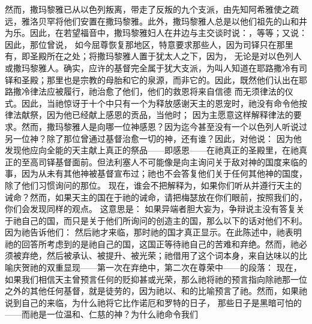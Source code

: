 然而，撒玛黎雅已从以色列叛离，带走了反叛的九个支派，由先知阿希雅使之疏远，雅洛贝罕将他们安置在撒玛黎雅。此外，撒玛黎雅人总是以他们祖先的山和井为乐。因此，在若望福音中，撒玛黎雅妇人在井边与主交谈时说：，等等；又说： 因此，那位曾说， 如今屈尊恢复那地区，特意要求那些人，因为司铎只在那里有，即圣殿所在之处；将撒玛黎雅人置于犹太人之下，因为， 无论是对以色列人或撒玛黎雅人。确实，应许的基督完全属于犹大支派，为叫人知道在耶路撒冷有司铎和圣殿；那里也是宗教的母胎和它的泉源，而非它的。因此，既然他们认出在耶路撒冷律法应被履行，祂治愈了他们，他们的救恩将来自信德 而无须律法的仪式。因此，当祂惊讶于十个中只有一个为释放感谢天主的恩宠时，祂没有命令他按律法献祭，因为他已经献上感恩的贡品，当他时； 因为主愿意这样解释律法的要求。然而，撒玛黎雅人是向哪一位神感恩？因为迄今甚至没有一个以色列人听说过另一位神？除了那位曾通过基督治愈一切的神，还有谁？因此，对他说： 因为他发现他应向全能的天主献上真正的祭品——即感恩——在祂真正的圣殿里，在祂真正的至高司铎基督面前。\newline{}但法利塞人不可能像是向主询问关于敌对神的国度来临的事，因为从未有其他神被基督宣布过；祂也不会答复他们关于任何其他神的国度，除了他们习惯询问的那位。 现在，谁会不把解释为，如果你们听从并遵行天主的诫命？然而，如果天主的国在于祂的诫命，请把梅瑟放在你们眼前，按照我们的，你们会发现同样的观点。 这意思是： 如果异端者胆大妄为，争辩说主没有答复关于祂自己的国，而只是关于他们所询问的创造主的国，那么以下的话对他们不利。因为祂告诉他们： 然后祂才来临，那时祂的国才真正显示。在此陈述中，祂表明祂的回答所考虑到的是祂自己的国，这国正等待祂自己的苦难和弃绝。然而，祂必须被弃绝，然后被承认、被提升、被光荣；祂借用了这个词本身，来自达味以的比喻庆贺祂的双重显现——第一次在弃绝中，第二次在尊荣中——的段落： 现在，如果我们相信天主曾预言任何的贬抑甚或光荣，那么祂将祂的预言指向除祂那一位之外的其他任何基督，就是徒劳的，因为祂以、和的比喻预言了祂。然而，如果祂说到自己的来临，为什么祂将它比作诺厄和罗特的日子， 那些日子是黑暗可怕的——而祂是一位温和、仁慈的神？为什么祂命令我们 